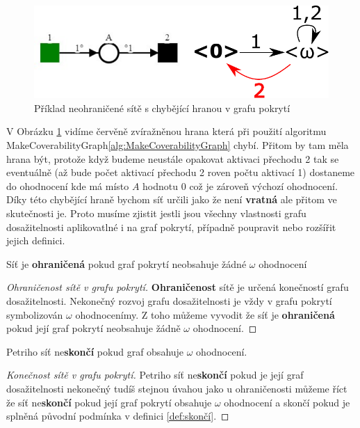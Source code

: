 \documentclass[
  biblatex,
  glossaries,
  index
]{kidiplom}
\begin{document}
\begin{figure}[h]
  \centering
  \includegraphics[width=\linewidth]{net_undecidable_reversion}
  \caption{Příklad neohraničené sítě s chybějící hranou v grafu pokrytí}\label{fig:neohraničená síť reversible}
\end{figure}

V Obrázku \ref{fig:neohraničená síť reversible} vidíme červěně zvíražněnou 
hrana která při použití algoritmu MakeCoverabilityGraph\ref{alg:MakeCoverabilityGraph}
chybí. Přitom by tam měla hrana být, protože když budeme neustále opakovat 
aktivaci přechodu 2 tak se eventuálně (až bude počet aktivací přechodu 2 roven počtu aktivací 1) 
dostaneme do ohodnocení kde má místo $A$
hodnotu 0 což je zároveň výchozí ohodnocení. Díky této chybějící hraně 
bychom síť určili jako že není \textbf{vratná} ale přitom ve skutečnosti je.
Proto musíme zjistit jestli jsou všechny vlastnosti grafu dosažitelnosti 
aplikovatlné i na graf pokrytí, případně poupravit nebo rozšířit jejich definici.

Síť je \textbf{ohraničená} pokud graf pokrytí neobsahuje žádné $\omega$ ohodnocení
\begin{proof}[Ohraničenost sítě v grafu pokrytí]
  \textbf{Ohraničenost} sítě je určená konečností grafu dosažitelnosti.
  Nekonečný rozvoj grafu dosažitelnosti je vždy v grafu pokrytí symbolizován
  $\omega$ ohodnocenímy. Z toho můžeme vyvodit že síť je 
  \textbf{ohraničená} pokud její graf pokrytí neobsahuje žádně $\omega$ ohodnocení.
\end{proof}


Petriho síť ne\textbf{skončí} pokud graf obsahuje $\omega$ ohodnocení.
\begin{proof}[Konečnost sítě v grafu pokrytí]
  Petriho síť ne\textbf{skončí} pokud je její graf dosažitelnosti nekonečný tudíš
  stejnou úvahou jako u ohraničenosti můžeme říct že síť ne\textbf{skončí}
  pokud její graf pokrytí obsahuje $\omega$ ohodnocení a skončí pokud je splněná
  původní podmínka v definici \ref{def:skončí}.
\end{proof}
\end{document}
